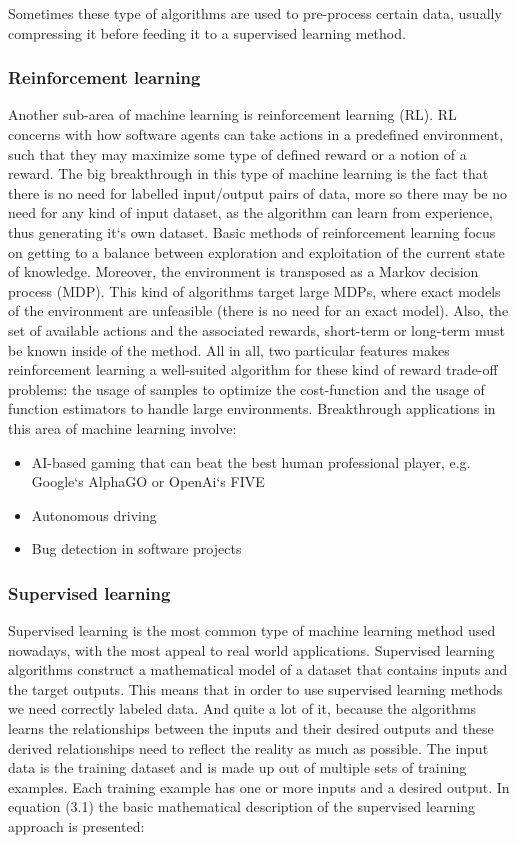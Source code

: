 \documentclass[12pt,a4paper,twoside]{report}
\begin{document}
Sometimes these type of algorithms are used to pre-process certain data, usually compressing it before feeding it to a supervised learning method.\par

\subsubsection{Reinforcement learning}
Another sub-area of machine learning is reinforcement learning (RL). RL concerns with how software agents can take actions in a predefined environment, such that they may maximize some type of defined reward or a notion of a reward. The big breakthrough in this type of machine learning is the fact that there is no need for labelled input/output pairs of data, more so there may be no need for any kind of input dataset, as the algorithm can learn from experience, thus generating it`s own dataset. Basic methods of reinforcement learning focus on getting to a balance between exploration and exploitation of the current state of knowledge. Moreover, the environment is transposed as a Markov decision process (MDP). This kind of algorithms target large MDPs, where exact models of the environment are unfeasible (there is no need for an exact model). Also, the set of available actions and the associated rewards, short-term or long-term must be known inside of the method. All in all, two particular features makes reinforcement learning a well-suited algorithm for these kind of reward trade-off problems: the usage of samples to optimize the cost-function and the usage of function estimators to handle large environments. Breakthrough applications in this area of machine learning involve: 
\begin{itemize}
    \item AI-based gaming that can beat the best human professional player, e.g. Google`s AlphaGO or OpenAi`s FIVE
    \item Autonomous driving
    \item Bug detection in software projects
\end{itemize}



\subsubsection{Supervised learning}
Supervised learning is the most common type of machine learning method used nowadays, with the most appeal to real world applications. Supervised learning algorithms construct a mathematical model of a dataset that contains inputs and the target outputs. This means that in order to use supervised learning methods we need correctly labeled data. And quite a lot of it, because the algorithms learns the relationships between the inputs and their desired outputs and these derived relationships need to reflect the reality as much as possible. The input data is the training dataset and is made up out of multiple sets of training examples. Each training example has one or more inputs and a desired output. In equation (3.1) the basic mathematical description of the supervised learning approach is presented:
\end{document}
